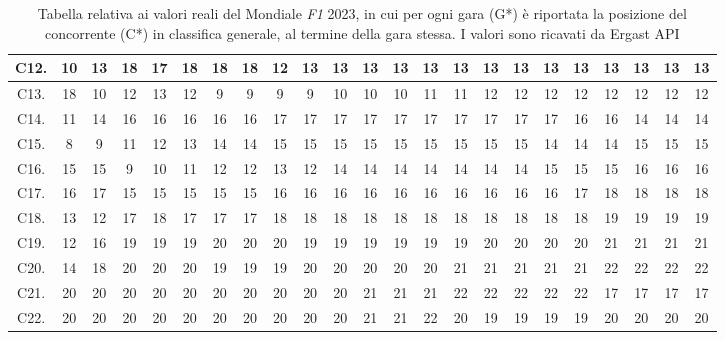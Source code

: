 \documentclass[12pt,a4paper,openright,twoside]{book}
\begin{document}
\begin{table}[H]
{\begin{tabular}{|c|c|c|c|c|c|c|c|c|c|c|c|c|c|c|c|c|c|c|c|c|c|c|}
    C12. & 10 & 13 & 18 & 17 & 18 & 18 & 18 & 12 & 13 & 13 & 13 & 13 & 13 & 13 & 13 & 13 & 13 & 13 & 13 & 13 & 13 & 13 \\ \hline
    C13. & 18 & 10 & 12 & 13 & 12 & 9 & 9 & 9 & 9 & 10 & 10 & 10 & 11 & 11 & 12 & 12 & 12 & 12 & 12 & 12 & 12 & 12 \\ \hline
    C14. & 11 & 14 & 16 & 16 & 16 & 16 & 16 & 17 & 17 & 17 & 17 & 17 & 17 & 17 & 17 & 17 & 17 & 16 & 16 & 14 & 14 & 14 \\ \hline
    C15. & 8 & 9 & 11 & 12 & 13 & 14 & 14 & 15 & 15 & 15 & 15 & 15 & 15 & 15 & 15 & 15 & 14 & 14 & 14 & 15 & 15 & 15 \\ \hline
    C16. & 15 & 15 & 9 & 10 & 11 & 12 & 12 & 13 & 12 & 14 & 14 & 14 & 14 & 14 & 14 & 14 & 15 & 15 & 15 & 16 & 16 & 16 \\ \hline
    C17. & 16 & 17 & 15 & 15 & 15 & 15 & 15 & 16 & 16 & 16 & 16 & 16 & 16 & 16 & 16 & 16 & 16 & 17 & 18 & 18 & 18 & 18 \\ \hline
    C18. & 13 & 12 & 17 & 18 & 17 & 17 & 17 & 18 & 18 & 18 & 18 & 18 & 18 & 18 & 18 & 18 & 18 & 18 & 19 & 19 & 19 & 19 \\ \hline
    C19. & 12 & 16 & 19 & 19 & 19 & 20 & 20 & 20 & 19 & 19 & 19 & 19 & 19 & 19 & 20 & 20 & 20 & 20 & 21 & 21 & 21 & 21 \\ \hline
    C20. & 14 & 18 & 20 & 20 & 20 & 19 & 19 & 19 & 20 & 20 & 20 & 20 & 20 & 21 & 21 & 21 & 21 & 21 & 22 & 22 & 22 & 22 \\ \hline
    C21. & 20 & 20 & 20 & 20 & 20 & 20 & 20 & 20 & 20 & 20 & 21 & 21 & 21 & 22 & 22 & 22 & 22 & 22 & 17 & 17 & 17 & 17 \\ \hline
    C22. & 20 & 20 & 20 & 20 & 20 & 20 & 20 & 20 & 20 & 20 & 21 & 21 & 22 & 20 & 19 & 19 & 19 & 19 & 20 & 20 & 20 & 20 \\ \hline
    \end{tabular}}
    \endgroup

    \caption{Tabella relativa ai valori reali del Mondiale \textit{F1} 2023, in cui per ogni gara (G*)  è riportata la posizione del concorrente (C*) in classifica generale, al termine della gara stessa.
    I valori sono ricavati da Ergast API \cite{WebsiteErgastAPIStandings}}
    \label{table:classifichegeneralireali2023tabella}
\end{table}
\end{document}
